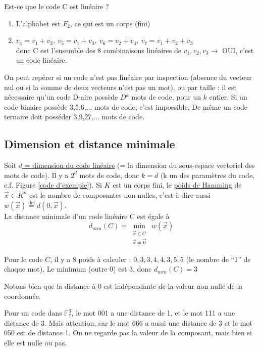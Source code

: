 \documentclass[11pt,a4paper]{article}
\newcommand{\F}{\ensuremath{\mathbb{F}}}
\begin{document}
\begin{exemple}[0.75]
	Est-ce que le code C est linéaire ?
	\begin{enumerate}
		\item 	L'alphabet est $F_2$, ce qui est un corps (fini)
		\item 	$v_4 = v_1 + v_2,\ v_5 = v_1+v_3,\ v_6 = v_2+v_3,\ v_7 = v_1+v_2+v_3$\\
				donc C est l'ensemble des 8 combinaisons linéaires de $v_1,v_2,v_3 \to$ OUI, c'est un code linéaire.
	\end{enumerate}
	On peut repérer si un code n'est pas linéaire par inspection (absence du vecteur nul ou si la somme de deux vecteurs n'est pas un mot), ou par taille : il est nécessaire qu'un code D-aire possède $D^k$ mots de code, pour un $k$ entier. Si un code binaire possède 3,5,6,... mots de code, c'est impossible, De même un code ternaire doit posséder 3,9,27,... mots de code.
\end{exemple}
\subsection{Dimension et distance minimale}
Soit \uline{$d$ = dimension du code linéaire} (= la dimension du sous-espace vectoriel des mots de code). Il y a $2^d$ mots de code, donc $k=d$ (k un des paramètres du code, c.f. Figure \ref{code d'exemple}).
 Si $K$ est un corps fini, le \uline{poids de Hamming} de $\vec{x} \in K^n$ est le nombre de composantes non-nulles, c'est à dire aussi $w(\vec{x}) \overset{\text{def}}{=} d(0,\vec{x})$.\\
La distance minimale d'un code linéaire C est égale à \[d_{min}(C) = \underset{\substack{\vec{x} \in C \\ \vec{x}\neq \vec{0}}}{\min}\, w(\vec{x})\]
\begin{exemple}
	Pour le code $C$, il y a 8 poids à calculer : $0,3,3,4,4,3,5,5$ (le nombre de \enquote{1} de chaque mot). Le minimum (outre 0) est 3, donc $d_{min}(C) = 3$
\end{exemple}
Notons bien que la distance à 0 est indépendante de la valeur non nulle de la coordonnée.
\begin{exemple}
	Pour un code dans $\F_7^3$, le mot 001 a une distance de 1, et le mot 111 a une distance de 3. Mais attention, car le mot 666 a aussi une distance de 3 et le mot 050 est de distance 1. On ne regarde pas la valeur de la composant, mais bien si elle est nulle ou pas.
\end{exemple}
\end{document}
